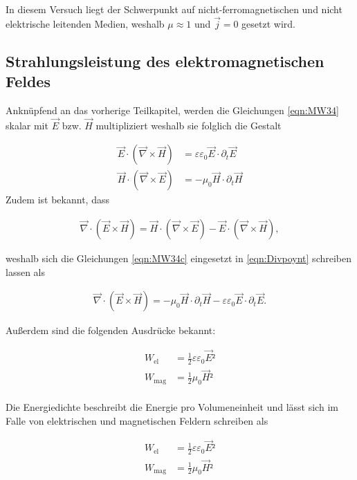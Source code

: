 \noindent In diesem Versuch liegt der Schwerpunkt auf nicht-ferromagnetischen und nicht elektrische leitenden Medien, weshalb $\mu \approx 1$ und $\vec{j} = 0$
gesetzt wird.  

\subsection{Strahlungsleistung des elektromagnetischen Feldes}

Anknüpfend an das vorherige Teilkapitel, werden die Gleichungen \eqref{eqn:MW34} skalar mit $\vec{E}$ bzw. $\vec{H}$ multipliziert weshalb sie folglich die Gestalt 

\begin{align}
\label{eqn:MW34c}
    \vec{E}\cdot\left(\vec{\nabla}\times\vec{H}\right) &= \varepsilon\varepsilon_0\vec{E}\cdot\partial_{t}\vec{E}\\
    \vec{H}\cdot\left(\vec{\nabla}\times\vec{E}\right) &= -\mu_0\vec{H}\cdot\partial_{t}\vec{H}
\end{align}
\newpage
\noindent Zudem ist bekannt, dass

\begin{align}
    \vec{\nabla}\cdot\left(\vec{E}\times\vec{H}\right) = \vec{H}\cdot\left(\vec{\nabla}\times\vec{E}\right) - \vec{E}\cdot\left(\vec{\nabla}\times\vec{H}\right),
    \label{eqn:Divpoynt}
\end{align}

\noindent weshalb sich die Gleichungen \eqref{eqn:MW34c} eingesetzt in \eqref{eqn:Divpoynt} schreiben lassen als

\begin{align}
\label{eqn:Divpoyntzsm}
    \vec{\nabla}\cdot\left(\vec{E}\times\vec{H}\right) = -\mu_0\vec{H}\cdot\partial_t\vec{H} - \varepsilon\varepsilon_0\vec{E}\cdot\partial_t\vec{E}.
\end{align}

\noindent Außerdem sind die folgenden Ausdrücke bekannt:

\begin{align}
    W_\text{el} &= \frac{1}{2}\varepsilon\varepsilon_0\vec{E}²\\
    W_\text{mag} &= \frac{1}{2}\mu_0\vec{H}²\\
\label{eqn:}
\end{align}

\noindent Die Energiedichte beschreibt die Energie pro Volumeneinheit und lässt sich im Falle von elektrischen und magnetischen Feldern schreiben als 

\begin{align}
\label{eqn:Energiedichten}
    W_\text{el} &= \frac{1}{2}\varepsilon\varepsilon_0\vec{E}²\\
    W_\text{mag} &= \frac{1}{2}\mu_0\vec{H}²\\
\end{align}

